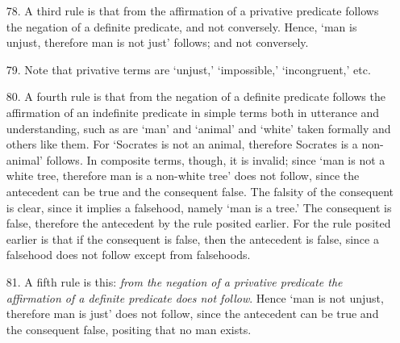 \documentclass[]{article}
\begin{document}
\begin{itemize}
\item[78.] A third rule is that from the affirmation of a privative predicate follows the negation of a definite predicate, and not conversely. Hence, `man is unjust, therefore man is not just' follows; and not conversely.
\item[79.] Note that privative terms are `unjust,' `impossible,' `incongruent,' etc.
\item[80.] A fourth rule is that from the negation of a definite predicate follows the affirmation of an indefinite predicate in simple terms both in utterance and understanding, such as are `man' and `animal' and `white' taken formally and others like them. For `Socrates is not an animal, therefore Socrates is a non-animal' follows. In composite terms, though, it is invalid; since `man is not a white tree, therefore man is a non-white tree' does not follow, since the antecedent can be true and the consequent false. The falsity of the consequent is clear, since it implies a falsehood, namely `man is a tree.' The consequent is false, therefore the antecedent by the rule posited earlier. For the rule posited earlier is that if the consequent is false, then the antecedent is false, since a falsehood does not follow except from falsehoods.
\item[81.] A fifth rule is this: \textit{from the negation of a privative predicate the affirmation of a definite predicate does not follow}. Hence `man is not unjust, therefore man is just' does not follow, since the antecedent can be true and the consequent false, positing that no man exists.
\end{itemize}
\end{document}
